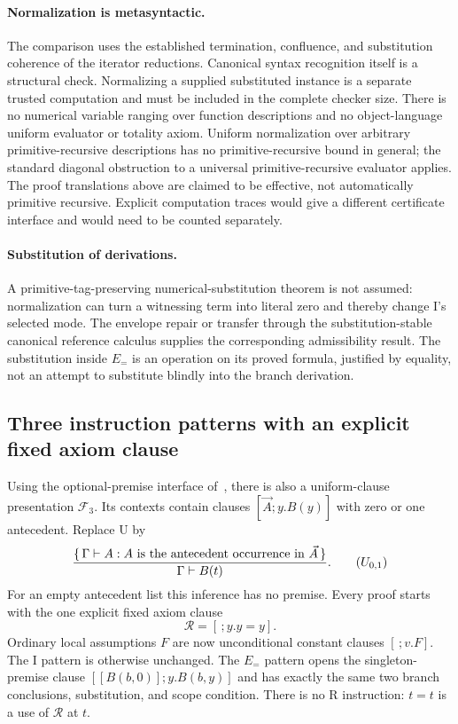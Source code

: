 \documentclass[11pt,letterpaper]{article}
\theoremstyle{definition}\newtheorem{definition}[theorem]{Definition}
\theoremstyle{remark}\newtheorem{remark}[theorem]{Remark}
\begin{document}
\paragraph{Normalization is metasyntactic.}
The comparison uses the established termination, confluence, and
substitution coherence of the iterator reductions. Canonical syntax
recognition itself is a structural check. Normalizing a supplied substituted
instance is a separate trusted computation and must be included in the
complete checker size. There is no numerical variable ranging over function
descriptions and no object-language uniform evaluator or totality axiom.
Uniform normalization over arbitrary primitive-recursive descriptions has
no primitive-recursive bound in general; the standard diagonal obstruction
to a universal primitive-recursive evaluator applies. The proof translations
above are claimed to be effective, not automatically primitive recursive.
Explicit computation traces would give a different certificate interface
and would need to be counted separately.

\paragraph{Substitution of derivations.}
A primitive-tag-preserving numerical-substitution theorem is not assumed:
normalization can turn a witnessing term into literal zero and thereby
change I's selected mode. The envelope repair or transfer through the
substitution-stable canonical reference calculus supplies the corresponding
admissibility result. The substitution inside $E_{=}$ is an operation on
its proved formula, justified by equality, not an attempt to substitute
blindly into the branch derivation.

\subsection{Three instruction patterns with an explicit fixed axiom clause}
\label{fus:three}

Using the optional-premise interface of~\cite{uniform}, there is also a uniform-clause presentation $\mathcal F_3$. Its contexts
contain clauses $[\vec A;y.B(y)]$ with zero or one antecedent. Replace U by
\[
 \frac{\{\,\Gamma\vdash A:A\text{ is the antecedent occurrence in }\vec A\,\}}
      {\Gamma\vdash B(t)}.
\tag{$U_{0,1}$}\label{fus:uniform-use}
\]
For an empty antecedent list this inference has no premise. Every proof
starts with the one explicit fixed axiom clause
\[
             \mathcal R=[\,;y.y=y].\tag{Ax}\label{fus:axiom}
\]
Ordinary local assumptions $F$ are now unconditional constant clauses
$[\,;v.F]$. The I pattern is otherwise unchanged. The $E_{=}$ pattern opens
the singleton-premise clause $[[B(b,0)];y.B(b,y)]$ and has exactly the same
two branch conclusions, substitution, and scope condition. There is no R
instruction: $t=t$ is a use of $\mathcal R$ at $t$.
\end{document}
